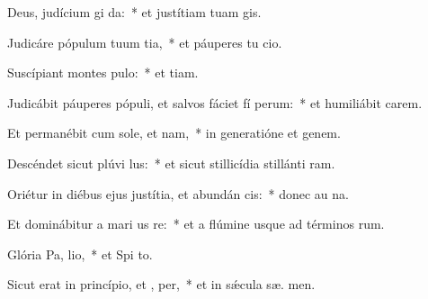 \item Deus, judícium  gi da:~* et justítiam tuam  gis.
\item Judicáre pópulum tuum  tia,~* et páuperes tu  cio.
\item Suscípiant montes  pulo:~* et  tiam.
\item Judicábit páuperes pópuli, et salvos fáciet fí perum:~* et humiliábit carem.
\item Et permanébit cum sole, et  nam,~* in generatióne et genem.
\item Descéndet sicut plúvi  lus:~* et sicut stillicídia stillánti  ram.
\item Oriétur in diébus ejus justítia, et abundán cis:~* donec au na.
\item Et dominábitur a mari us  re:~* et a flúmine usque ad términos  rum.
\item Glória Pa,  lio,~* et Spi to.
\item Sicut erat in princípio, et ,  per,~* et in sǽcula sæ. men.
